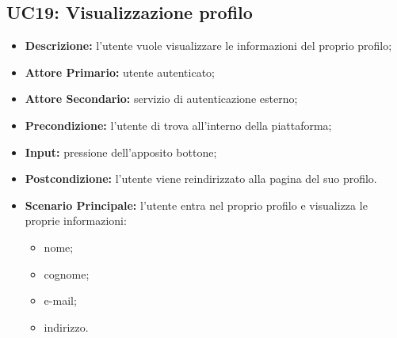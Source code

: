 \subsection{UC19: Visualizzazione profilo}
\label{sec:UC19}
\begin{itemize}
    \item \textbf{Descrizione:} l'utente vuole visualizzare le informazioni del proprio profilo;
    \item \textbf{Attore Primario:} utente autenticato;
    \item \textbf{Attore Secondario:} servizio di autenticazione esterno;
    \item \textbf{Precondizione:} l'utente di trova all'interno della piattaforma;
    \item \textbf{Input:} pressione dell'apposito bottone;
    \item \textbf{Postcondizione:} l'utente viene reindirizzato alla pagina del suo profilo.
    \item \textbf{Scenario Principale:} l'utente entra nel proprio profilo e visualizza le proprie informazioni:
          \begin{itemize}
              \item nome;
              \item cognome;
              \item e-mail;
              \item indirizzo.
          \end{itemize}
\end{itemize}